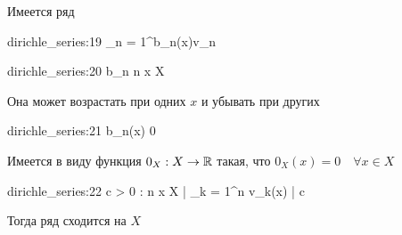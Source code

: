 \begin{theorem}
	Имеется ряд
	\begin{equ}{dirichle_series:19}
		\sum_{n = 1}^\infty b_n(x)v_n
	\end{equ}
	\begin{equ}{dirichle_series:20}
		b_n  n \quad \forall {} x \in X
	\end{equ}
	\begin{note}
		Она может возрастать при одних $ x $ и убывать при других
	\end{note}
	\begin{equ}{dirichle_series:21}
		b_n(x)  0
	\end{equ}
	\begin{note}
		Имеется в виду функция $ 0_X : X \to \mathbb{R} $ такая, что $ 0_X(x) = 0 \quad \forall x \in X $
	\end{note}
	\begin{equ}{dirichle_series:22}
		\exist c > 0 : \quad \forall n \quad \forall x \in X \quad \bigg| \sum_{k = 1}^n v_k(x) \bigg| \le c
	\end{equ}
	Тогда ряд   сходится на $ X $
\end{theorem}

